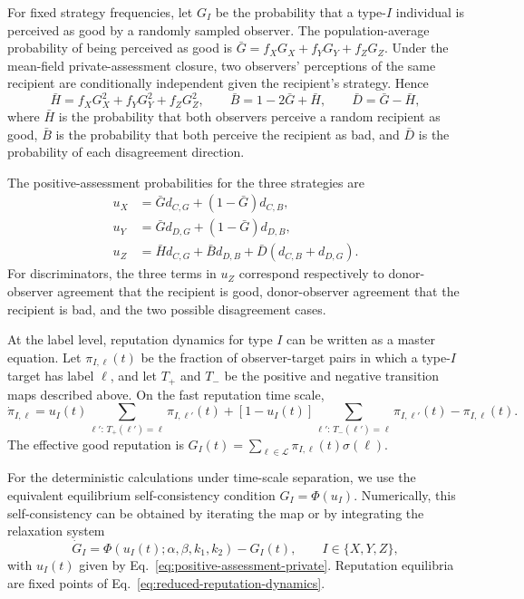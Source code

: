 \documentclass[fleqn,10pt]{wlscirep}
\begin{document}
For fixed strategy frequencies, let $G_I$ be the probability that a type-$I$ individual is perceived as good by a randomly sampled observer. The population-average probability of being perceived as good is $\bar G=f_XG_X+f_YG_Y+f_ZG_Z$. Under the mean-field private-assessment closure, two observers' perceptions of the same recipient are conditionally independent given the recipient's strategy. Hence
\[
\bar H=f_XG_X^2+f_YG_Y^2+f_ZG_Z^2,\qquad
\bar B=1-2\bar G+\bar H,\qquad
\bar D=\bar G-\bar H,
\]
where $\bar H$ is the probability that both observers perceive a random recipient as good, $\bar B$ is the probability that both perceive the recipient as bad, and $\bar D$ is the probability of each disagreement direction.

The positive-assessment probabilities for the three strategies are
\begin{equation}
\label{eq:positive-assessment-private}
\begin{aligned}
u_X &= \bar G d_{C,G}+(1-\bar G)d_{C,B},\\
u_Y &= \bar G d_{D,G}+(1-\bar G)d_{D,B},\\
u_Z &= \bar H d_{C,G}+\bar B d_{D,B}+\bar D(d_{C,B}+d_{D,G}).
\end{aligned}
\end{equation}
For discriminators, the three terms in $u_Z$ correspond respectively to donor-observer agreement that the recipient is good, donor-observer agreement that the recipient is bad, and the two possible disagreement cases.

At the label level, reputation dynamics for type $I$ can be written as a master equation. Let $\pi_{I,\ell}(t)$ be the fraction of observer-target pairs in which a type-$I$ target has label $\ell$, and let $T_+$ and $T_-$ be the positive and negative transition maps described above. On the fast reputation time scale,
\begin{equation}
\label{eq:label-master-equation}
\dot{\pi}_{I,\ell}
=u_I(t)\sum_{\ell':\,T_+(\ell')=\ell}\pi_{I,\ell'}(t)
+[1-u_I(t)]\sum_{\ell':\,T_-(\ell')=\ell}\pi_{I,\ell'}(t)
-\pi_{I,\ell}(t).
\end{equation}
The effective good reputation is $G_I(t)=\sum_{\ell\in\mathcal{L}}\pi_{I,\ell}(t)\sigma(\ell)$.

For the deterministic calculations under time-scale separation, we use the equivalent equilibrium self-consistency condition $G_I=\Phi(u_I)$. Numerically, this self-consistency can be obtained by iterating the map or by integrating the relaxation system
\begin{equation}
\label{eq:reduced-reputation-dynamics}
\dot G_I=\Phi(u_I(t);\alpha,\beta,k_1,k_2)-G_I(t),\qquad I\in\{X,Y,Z\},
\end{equation}
with $u_I(t)$ given by Eq.~\eqref{eq:positive-assessment-private}. Reputation equilibria are fixed points of Eq.~\eqref{eq:reduced-reputation-dynamics}.
\end{document}
